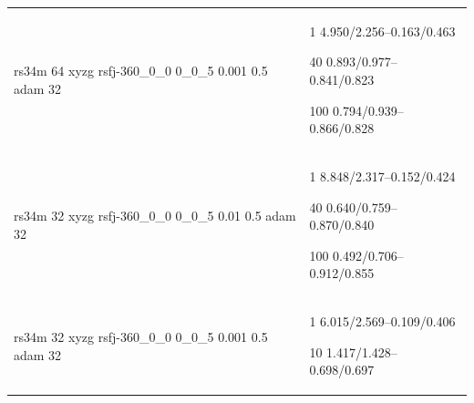 \documentclass[,table,dvipsnames]{article}
\begin{document}
\begin{tabular}{|p{9cm}|p{6cm}| }
	\rowcolor{yellow!20}
	rs34m 64 xyzg rsfj-360\_0\_0 0\_0\_5 0.001 0.5 adam 32& 1 4.950/2.256--0.163/0.463\par 40 0.893/0.977--0.841/0.823\par 100 0.794/0.939--0.866/0.828\\
	
	\rowcolor{green!20}
	rs34m 32 xyzg rsfj-360\_0\_0 0\_0\_5 0.01 0.5 adam 32&1 8.848/2.317--0.152/0.424\par 40 0.640/0.759--0.870/0.840\par 100 0.492/0.706--0.912/0.855\\
	
	\rowcolor{orange!20}
	rs34m 32 xyzg rsfj-360\_0\_0 0\_0\_5 0.001 0.5 adam 32& 1 6.015/2.569--0.109/0.406\par 10 1.417/1.428--0.698/0.697\\
	\hline 
\end{tabular}
\end{document}
